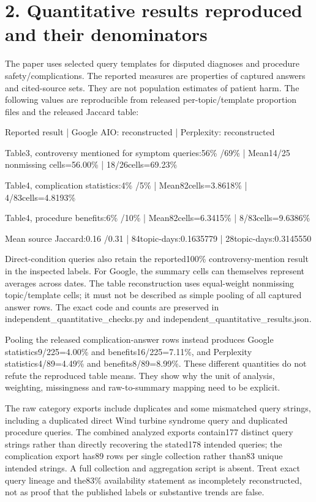 \documentclass[10pt]{article}
\begin{document}
\section*{2. Quantitative results reproduced and their denominators}
The paper uses selected query templates for disputed diagnoses and procedure safety/complications. The reported measures are properties of captured answers and cited-source sets. They are not population estimates of patient harm. The following values are reproducible from released per-topic/template proportion files and the released Jaccard table:\par
Reported result | Google AIO: reconstructed | Perplexity: reconstructed\par
Table3, controversy mentioned for symptom queries:56\% /69\% | Mean14/25 nonmissing cells=56.00\% | 18/26cells=69.23\%\par
Table4, complication statistics:4\% /5\% | Mean82cells=3.8618\% | 4/83cells=4.8193\%\par
Table4, procedure benefits:6\% /10\% | Mean82cells=6.3415\% | 8/83cells=9.6386\%\par
Mean source Jaccard:0.16 /0.31 | 84topic-days:0.1635779 | 28topic-days:0.3145550\par
Direct-condition queries also retain the reported100\% controversy-mention result in the inspected labels. For Google, the summary cells can themselves represent averages across dates. The table reconstruction uses equal-weight nonmissing topic/template cells; it must not be described as simple pooling of all captured answer rows. The exact code and counts are preserved in independent\_quantitative\_checks.py and independent\_quantitative\_results.json.\par
Pooling the released complication-answer rows instead produces Google statistics9/225=4.00\% and benefits16/225=7.11\%, and Perplexity statistics4/89=4.49\% and benefits8/89=8.99\%. These different quantities do not refute the reproduced table means. They show why the unit of analysis, weighting, missingness and raw-to-summary mapping need to be explicit.\par
The raw category exports include duplicates and some mismatched query strings, including a duplicated direct Wind turbine syndrome query and duplicated procedure queries. The combined analyzed exports contain177 distinct query strings rather than directly recovering the stated178 intended queries; the complication export has89 rows per single collection rather than83 unique intended strings. A full collection and aggregation script is absent. Treat exact query lineage and the83\% availability statement as incompletely reconstructed, not as proof that the published labels or substantive trends are false.\par
\end{document}
